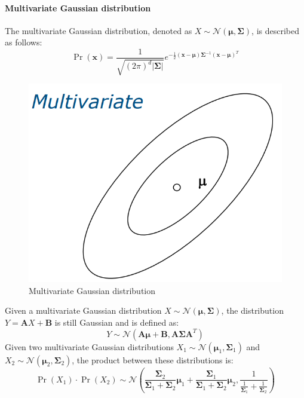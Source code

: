 \paragraph*{Multivariate Gaussian distribution}
The multivariate Gaussian distribution, denoted as $X\sim \mathcal{N}(\boldsymbol{\mu},\mathbf{\Sigma})$, is described as follows:
\[\Pr(\mathbf{x})=\dfrac{1}{\sqrt{(2\pi)^d\left\lvert \mathbf{\Sigma} \right\rvert }}e^{-\frac{1}{2}(\mathbf{x}-\boldsymbol{\mu})\mathbf{\Sigma}^{-1}(\mathbf{x}-\boldsymbol{\mu})^T}\]
\begin{figure}[H]
    \centering
    \includegraphics[width=0.6\linewidth]{images/mgd.png}
    \caption{Multivariate Gaussian distribution}
\end{figure}
Given a multivariate Gaussian distribution $X\sim \mathcal{N}(\boldsymbol{\mu},\mathbf{\Sigma})$, the distribution $Y=\mathbf{A}X+\mathbf{B}$ is still Gaussian and is defined as:
\[Y\sim \mathcal{N}(\mathbf{A\mu}+\mathbf{B},\mathbf{A\Sigma A}^T)\]
Given two multivariate Gaussian distributions $X_1\sim\mathcal{N}(\boldsymbol{\mu}_1,\mathbf{\Sigma}_1)$ and $X_2\sim\mathcal{N}(\boldsymbol{\mu}_2,\mathbf{\Sigma}_2)$, the product between these distributions is:
\[\Pr(X_1)\cdot\Pr(X_2)\sim\mathcal{N}\left(\dfrac{\mathbf{\Sigma}_2}{\mathbf{\Sigma}_1+\mathbf{\Sigma}_2}\boldsymbol{\mu}_1+\dfrac{\mathbf{\Sigma}_1}{\mathbf{\Sigma}_1+\mathbf{\Sigma}_2}\boldsymbol{\mu}_2,\dfrac{1}{\frac{1}{\mathbf{\Sigma}_1}+\frac{1}{\mathbf{\Sigma}_2}}\right)\]

